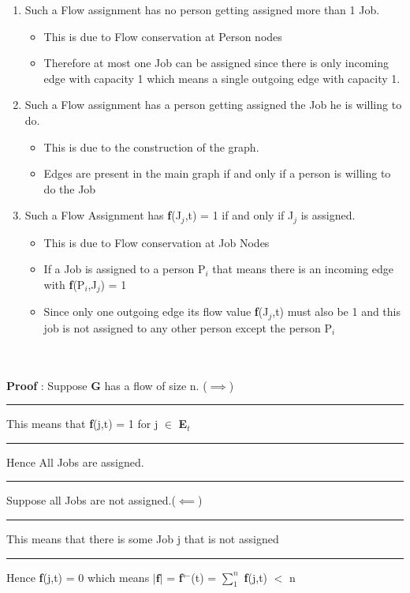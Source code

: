 \documentclass{report}
\begin{document}
 \begin{enumerate}
     \item Such a Flow assignment has no person getting assigned more than 1 Job.
     \begin{itemize}
         \item This is due to Flow conservation at Person nodes
         \item Therefore at most one Job can be assigned since there is only incoming edge with capacity 1 which means a single outgoing edge with capacity 1.
     \end{itemize}
     \item Such a Flow assignment has a person getting assigned the Job he is willing to do.
     \begin{itemize}
         \item This is due to the construction of the graph.
         \item Edges are present in the main graph if and only if a person is willing to do the Job
     \end{itemize}
     \item Such a Flow Assignment has \textbf{f}(J$_j$,t) = 1 if and only if J$_j$ is assigned.
     \begin{itemize}
         \item This is due to Flow conservation at Job Nodes
         \item If a Job is assigned to a person P$_i$ that means there is an incoming edge with \textbf{f}(P$_i$,J$_j$) = 1
         \item Since only one outgoing edge its flow value \textbf{f}(J$_j$,t) must also be 1 and this job is not assigned to any other person except the person P$_i$
     \end{itemize}
 \end{enumerate}
   \\
    \vspace*{0em}\\
 \textbf{Proof} : Suppose \textbf{G} has a flow of size n. ($\implies$)\vspace{0.5em}\\
 \rule[0.5mm]{1.1cm}{0pt} This means that \textbf{f}(j,t) = 1 for j $\in$ \textbf{E}$_t$\\
 \rule[0.5cm]{1.1cm}{0pt} Hence All Jobs are assigned.\\
 \rule[0.5cm]{1.1cm}{0pt} Suppose all Jobs are not assigned.($\impliedby$)\\
 \rule[0.5cm]{1.1cm}{0pt} This means that there is some Job j that is not assigned\\
 \rule[0.5cm]{1.1cm}{0pt} Hence \textbf{f}(j,t) = 0  which means $|\mathbf{f}|$ = \textbf{f}$^\gets$(t) = $\sum_1^n$ \textbf{f}(j,t) $<$ n\\
\end{document}
